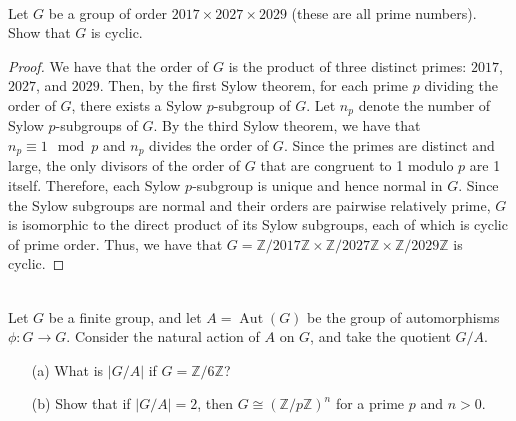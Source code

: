 \documentclass{article}
\def\zz{{\mathbb Z}}
\begin{document}
\newpage 
\begin{problem} \\
    Let $G$ be a group of order $2017 \times 2027 \times 2029$ (these are all prime numbers). Show that $G$ is cyclic.
\end{problem}


\begin{proof}
    We have that the order of $G$ is the product of three distinct primes: $2017$, $2027$, and $2029$. Then, by the first Sylow theorem, for each prime $p$ dividing the order of $G$, there exists a Sylow $p$-subgroup of $G$. Let $n_p$ denote the number of Sylow $p$-subgroups of $G$. By the third Sylow theorem, we have that $n_p \equiv 1 \mod p$ and $n_p$ divides the order of $G$. Since the primes are distinct and large, the only divisors of the order of $G$ that are congruent to 1 modulo $p$ are 1 itself. Therefore, each Sylow $p$-subgroup is unique and hence normal in $G$. Since the Sylow subgroups are normal and their orders are pairwise relatively prime, $G$ is isomorphic to the direct product of its Sylow subgroups, each of which is cyclic of prime order. Thus, we have that $G = \zz/2017\zz \times \zz/2027\zz \times \zz/2029\zz$ is cyclic.
\end{proof}



\begin{problem} \\
    Let $G$ be a finite group, and let $A = \operatorname{Aut}(G)$ be the group of automorphisms $\phi : G \to G$. Consider the natural action of $A$ on $G$, and take the quotient $G/A$.
    \begin{enumerate}
        \item[(a)] What is $|G/A|$ if $G = \zz/6\zz$? %
        \item[(b)] Show that if $|G/A| = 2$, then $G \cong (\zz/p\zz)^n$ for a prime $p$ and $n > 0$. %
    \end{enumerate}
\end{problem}
\end{document}
